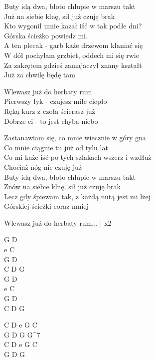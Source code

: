 \begin{text}
    Buty idą dwa, błoto chlupie w marszu takt\\
    Już na siebie klnę, sił już czuję brak\\
    Kto wygonił mnie kazał iść w tak podłe dni?\\
    Górska ścieżko powiedz mi.\\
    A ten plecak - garb każe drzewom kłaniać się\\
    W dół pochylam grzbiet, oddech mi się rwie\\
    Za zakrętem gdzieś zamajaczył znany kształt\\
    Już za chwilę będę tam

    \vin Wlewasz już do herbaty rum\\
    \vin Pierwszy łyk - czujesz miłe ciepło\\
    \vin Ręką kurz z czoła ścierasz już\\
    \vin Dobrze ci - to jest chyba niebo

    Zastanawiam się, co mnie wiecznie w góry gna\\
    Co mnie ciągnie tu już od tylu lat\\
    Co mi każe iść po tych szlakach wszerz i wzdłuż\\
    Chociaż nóg nie czuję już\\
    Buty idą dwa, błoto chlupie w marszu takt\\
    Znów na siebie klnę, sił już czuję brak\\
    Lecz gdy śpiewam tak, z każdą nutą jest mi lżej\\
    Górskiej ścieżki coraz mniej

    \vin Wlewasz już do herbaty rum... | x2
\end{text}
\begin{chord}
    G D\\
    e C\\
    G D\\
    C D G\\
    G D\\
    e C\\
    G D\\
    C D G

    C D e G C\\
    G D G G^7\\
    C D e G C\\
    G D G
\end{chord}